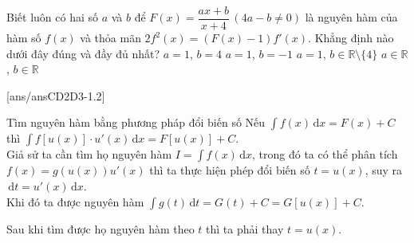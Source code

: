 \begin{ex}%
	Biết luôn có hai số $a$ và $b$ để $F(x)=\dfrac{ax+b}{x+4} \, (4a-b\neq 0)$ là nguyên hàm của hàm số $f(x)$ và thỏa mãn $2f^2(x)=\left(F(x)-1\right)f'(x)$.	Khẳng định nào dưới đây đúng và đầy đủ nhất?
	\choice
	{$a=1$, $b=4$}
	{$a=1$, $b=-1$}
	{\True $a=1$, $b\in\mathbb{R}\setminus\{4\}$}
	{$a\in\mathbb{R}$, $b\in\mathbb{R}$}
\end{ex}


[ans/ansCD2D3-1.2]
\begin{dang}{Tìm nguyên hàm bằng phương pháp đổi biến số}
	Nếu $\displaystyle\int f(x)\mathrm{\,d}x=F(x)+C$ thì $\displaystyle\int f[u(x)]\cdot u'(x)\mathrm{\,d}x=F[u(x)]+C$.\\
	Giả sử ta cần tìm họ nguyên hàm $I=\displaystyle\int f(x)\mathrm{\,d}x$, trong đó ta có thể phân tích $f(x)=g\left(u(x)\right)u'(x)$ thì ta thực hiện phép đổi biến số $t=u(x)$, suy ra $\mathrm{\,d}t=u'(x)\mathrm{\,d}x$.\\
	Khi đó ta được nguyên hàm $\displaystyle\int g(t)\mathrm{\,d}t=G(t)+C=G[u(x)]+C$.\\
	\begin{note} Sau khi tìm được họ nguyên hàm theo $t$ thì ta phải thay $t=u(x)$.
	\end{note}
\end{dang}
